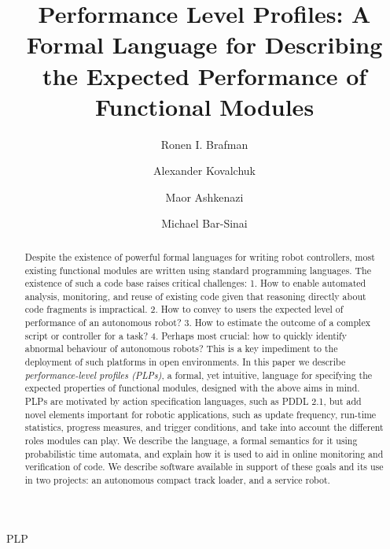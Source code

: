\documentclass[ 5p, 12pt, times, twocolumn, sort&compress ]{elsarticle}
\begin{document}
\begin{frontmatter}

\dochead{}

\title{\LARGE \bf Performance Level Profiles: A Formal Language for Describing the Expected Performance of Functional Modules}


\author[braf]{Ronen I. Brafman}

\author[kova]{Alexander Kovalchuk}

\author[ashk]{Maor Ashkenazi}

\author[bar]{Michael Bar-Sinai}

\address[braf,kova,ashk,bar]{Department of Computer Science, Ben-Gurion University, Beer-Sheva, Israel}



\begin{abstract}

Despite the existence of powerful formal languages for writing robot controllers, most existing functional modules are written using standard
programming languages. The existence of such a code base raises critical challenges: 1. How to enable automated analysis, monitoring, and reuse of existing code given that reasoning directly about code fragments is  impractical. 
2. How to convey to users the expected level of performance of an autonomous robot?
3. How to estimate the outcome of a complex script or controller for a task?
4. Perhaps most crucial: how to quickly identify abnormal behaviour of autonomous robots? This is a key impediment to the
deployment of such platforms in open environments.
In this paper we describe {\em performance-level profiles (PLPs)\/}, a formal, yet intuitive, 
language for specifying the expected properties of functional modules, designed with the above aims in mind. 
PLPs are motivated by action specification languages, such as PDDL 2.1,
but add novel elements important for robotic applications, such as update frequency, run-time statistics, progress measures, and trigger conditions, 
and take into account the different roles modules can play. We describe the language, a formal semantics for it using probabilistic time automata, and
explain how it is used to aid in online monitoring and verification of code. We describe software available in support of these goals and its
use in two projects: an autonomous compact track loader, and a service robot. 


\end{abstract}

\begin{keyword}
PLP
\end{keyword}


\end{frontmatter}
\end{document}

